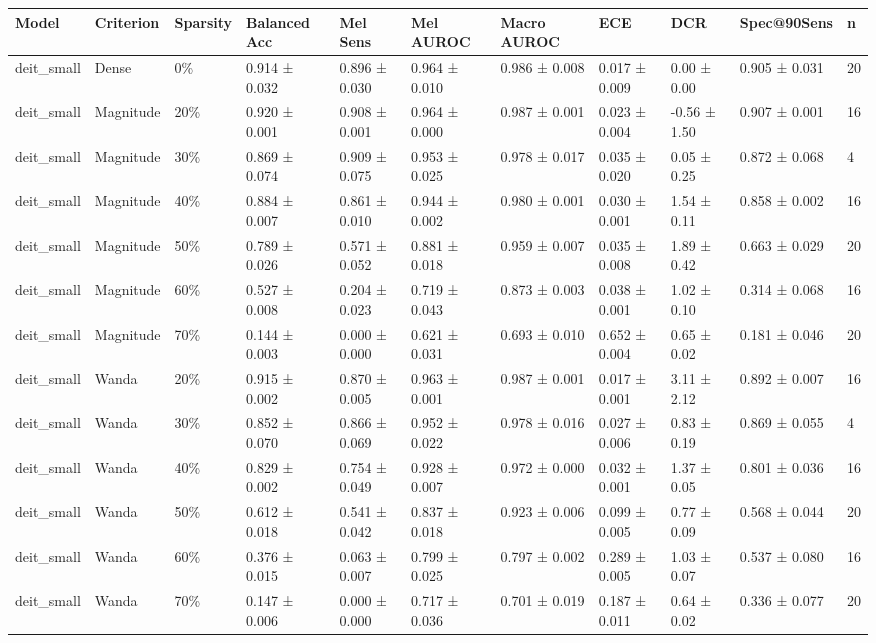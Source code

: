 \begin{table}[t]
\centering
\small
\begin{tabular}{lllllllllll}
\toprule
Model & Criterion & Sparsity & Balanced Acc & Mel Sens & Mel AUROC & Macro AUROC & ECE & DCR & Spec@90Sens & n \\
\midrule
deit\_small & Dense & 0\% & 0.914 ± 0.032 & 0.896 ± 0.030 & 0.964 ± 0.010 & 0.986 ± 0.008 & 0.017 ± 0.009 & 0.00 ± 0.00 & 0.905 ± 0.031 & 20 \\
deit\_small & Magnitude & 20\% & 0.920 ± 0.001 & 0.908 ± 0.001 & 0.964 ± 0.000 & 0.987 ± 0.001 & 0.023 ± 0.004 & -0.56 ± 1.50 & 0.907 ± 0.001 & 16 \\
deit\_small & Magnitude & 30\% & 0.869 ± 0.074 & 0.909 ± 0.075 & 0.953 ± 0.025 & 0.978 ± 0.017 & 0.035 ± 0.020 & 0.05 ± 0.25 & 0.872 ± 0.068 & 4 \\
deit\_small & Magnitude & 40\% & 0.884 ± 0.007 & 0.861 ± 0.010 & 0.944 ± 0.002 & 0.980 ± 0.001 & 0.030 ± 0.001 & 1.54 ± 0.11 & 0.858 ± 0.002 & 16 \\
deit\_small & Magnitude & 50\% & 0.789 ± 0.026 & 0.571 ± 0.052 & 0.881 ± 0.018 & 0.959 ± 0.007 & 0.035 ± 0.008 & 1.89 ± 0.42 & 0.663 ± 0.029 & 20 \\
deit\_small & Magnitude & 60\% & 0.527 ± 0.008 & 0.204 ± 0.023 & 0.719 ± 0.043 & 0.873 ± 0.003 & 0.038 ± 0.001 & 1.02 ± 0.10 & 0.314 ± 0.068 & 16 \\
deit\_small & Magnitude & 70\% & 0.144 ± 0.003 & 0.000 ± 0.000 & 0.621 ± 0.031 & 0.693 ± 0.010 & 0.652 ± 0.004 & 0.65 ± 0.02 & 0.181 ± 0.046 & 20 \\
deit\_small & Wanda & 20\% & 0.915 ± 0.002 & 0.870 ± 0.005 & 0.963 ± 0.001 & 0.987 ± 0.001 & 0.017 ± 0.001 & 3.11 ± 2.12 & 0.892 ± 0.007 & 16 \\
deit\_small & Wanda & 30\% & 0.852 ± 0.070 & 0.866 ± 0.069 & 0.952 ± 0.022 & 0.978 ± 0.016 & 0.027 ± 0.006 & 0.83 ± 0.19 & 0.869 ± 0.055 & 4 \\
deit\_small & Wanda & 40\% & 0.829 ± 0.002 & 0.754 ± 0.049 & 0.928 ± 0.007 & 0.972 ± 0.000 & 0.032 ± 0.001 & 1.37 ± 0.05 & 0.801 ± 0.036 & 16 \\
deit\_small & Wanda & 50\% & 0.612 ± 0.018 & 0.541 ± 0.042 & 0.837 ± 0.018 & 0.923 ± 0.006 & 0.099 ± 0.005 & 0.77 ± 0.09 & 0.568 ± 0.044 & 20 \\
deit\_small & Wanda & 60\% & 0.376 ± 0.015 & 0.063 ± 0.007 & 0.799 ± 0.025 & 0.797 ± 0.002 & 0.289 ± 0.005 & 1.03 ± 0.07 & 0.537 ± 0.080 & 16 \\
deit\_small & Wanda & 70\% & 0.147 ± 0.006 & 0.000 ± 0.000 & 0.717 ± 0.036 & 0.701 ± 0.019 & 0.187 ± 0.011 & 0.64 ± 0.02 & 0.336 ± 0.077 & 20 \\

\end{tabular}
\end{table}

